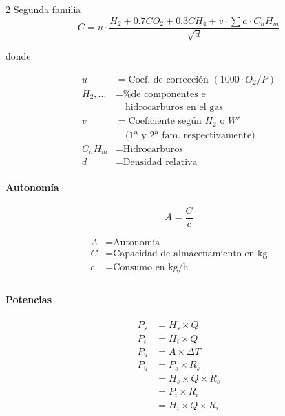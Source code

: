 \documentclass[11pt]{article}
\begin{document}
\begin{multicols*}{2}
    Segunda familia 
    \begin{equation*}
        C = u \cdot \frac{H_2 + 0.7 CO_2 + 0.3 CH_4 +v \cdot \sum a \cdot C_nH_m}{\sqrt{d}}
    \end{equation*}

    donde 
    \begin{minipage}{\linewidth}
        \begin{align*}
            u &= \text{Coef. de corrección } (1000 \cdot O_2 / P) \\
            H_2, \dots &= \text{\% de componentes e} \\
            &\quad \text{hidrocarburos en el gas} \\
            v &= \text{Coeficiente según } H_2 \text{ o } W' \\
            &\quad \text{(1ª y 2ª fam. respectivamente)} \\
            C_n H_m &= \text{Hidrocarburos} \\
            d &= \text{Densidad relativa}
        \end{align*}
    \end{minipage}

    \paragraph{Autonomía}

    \begin{equation*}
        A = \frac{C}{c}
    \end{equation*}

    \begin{minipage}{\linewidth}
        \begin{align*}
            A &= \text{Autonomía} \\ 
            C &= \text{Capacidad de almacenamiento en kg} \\ 
            c &= \text{Consumo en kg/h} \\
        \end{align*}
    \end{minipage}

    \paragraph{Potencias}

    \begin{align*}
        P_s & = H_s \times Q \\
        P_i & = H_i \times Q \\
        P_u & = A \times \Delta T \\
        P_u & = P_s \times R_s \\
        & = H_s \times Q \times R_s \\
        & = P_i \times R_i \\
        & = H_i \times Q \times R_i 
    \end{align*}


\end{multicols*}
\end{document}
